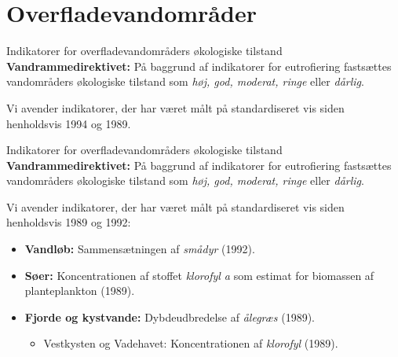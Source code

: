 \section{Overfladevandområder}

\begin{frame}{Indikatorer for overfladevandområders økologiske tilstand}
  \textbf{Vandrammedirektivet:} På baggrund af indikatorer for eutrofiering fastsættes vandområders økologiske tilstand som \textit{høj, god, moderat, ringe} eller \textit{dårlig}.\par
  Vi avender indikatorer, der har været målt på standardiseret vis siden henholdsvis 1994 og 1989.
  \vfill
\end{frame}
\begin{frame}{Indikatorer for overfladevandområders økologiske tilstand}
  \textbf{Vandrammedirektivet:} På baggrund af indikatorer for eutrofiering fastsættes vandområders økologiske tilstand som \textit{høj, god, moderat, ringe} eller \textit{dårlig}.\par
  Vi avender indikatorer, der har været målt på standardiseret vis siden henholdsvis 1989 og 1992:
  \begin{itemize}
    \item \textbf{Vandløb:} Sammensætningen af \textit{smådyr} (1992).
    \item \textbf{Søer:} Koncentrationen af stoffet \textit{klorofyl a} som estimat for biomassen af planteplankton (1989).
    \item \textbf{Fjorde og kystvande:} Dybdeudbredelse af \textit{ålegræs} (1989).
    \begin{itemize}
      \item Vestkysten og Vadehavet: Koncentrationen af \textit{klorofyl} (1989).
    \end{itemize}
  \end{itemize}
\end{frame}

